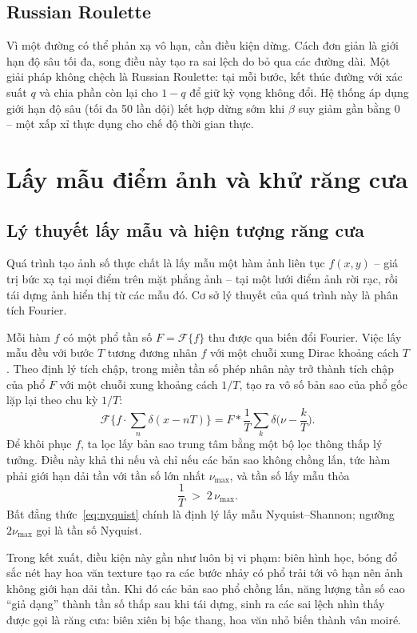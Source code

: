 \subsection{Russian Roulette}
Vì một đường có thể phản xạ vô hạn, cần điều kiện dừng. Cách đơn giản là giới hạn
độ sâu tối đa, song điều này tạo ra sai lệch do bỏ qua các đường dài. Một
giải pháp không chệch là Russian Roulette: tại mỗi
bước, kết thúc đường với xác suất $q$ và chia phần còn lại cho $1-q$ để giữ kỳ
vọng không đổi. Hệ thống áp dụng giới hạn độ sâu (tối đa 50 lần dội) kết hợp dừng
sớm khi $\beta$ suy giảm gần bằng 0 -- một xấp xỉ thực dụng cho chế độ thời gian
thực.

\section{Lấy mẫu điểm ảnh và khử răng cưa}

\subsection{Lý thuyết lấy mẫu và hiện tượng răng cưa}
Quá trình tạo ảnh số thực chất là lấy mẫu một hàm ảnh liên tục
$f(x,y)$ -- giá trị bức xạ tại mọi điểm trên mặt phẳng ảnh -- tại một lưới điểm
ảnh rời rạc, rồi tái dựng ảnh hiển thị từ các mẫu đó. Cơ
sở lý thuyết của quá trình này là phân tích Fourier.

Mỗi hàm $f$ có một phổ tần số $F = \mathcal{F}\{f\}$ thu được qua biến đổi
Fourier. Việc lấy mẫu đều với bước $T$ tương đương nhân $f$ với một chuỗi xung
Dirac khoảng cách $T$. Theo định lý tích chập, trong miền tần số
phép nhân này trở thành tích chập của phổ $F$ với một chuỗi xung khoảng cách
$1/T$, tạo ra vô số bản sao của phổ gốc lặp lại theo chu kỳ $1/T$:
\begin{equation}
\mathcal{F}\Big\{ f \cdot \textstyle\sum_n \delta(x - nT)\Big\}
   = F * \frac{1}{T}\sum_k \delta\!\Big(\nu - \frac{k}{T}\Big).
\end{equation}
Để khôi phục $f$, ta lọc lấy bản sao trung tâm bằng một bộ lọc thông thấp lý
tưởng. Điều này khả thi nếu và chỉ nếu các bản sao không chồng lấn, tức
hàm phải giới hạn dải tần với tần số lớn nhất $\nu_{\max}$,
và tần số lấy mẫu thỏa
\begin{equation}
\label{eq:nyquist}
\frac{1}{T} \;>\; 2\,\nu_{\max} .
\end{equation}
Bất đẳng thức~\eqref{eq:nyquist} chính là định lý lấy mẫu
Nyquist--Shannon; ngưỡng $2\nu_{\max}$ gọi là tần số Nyquist.

Trong kết xuất, điều kiện này gần như luôn bị vi phạm: biên hình học, bóng đổ
sắc nét hay hoa văn texture tạo ra các bước nhảy có phổ trải tới vô hạn
nên ảnh không giới hạn dải tần. Khi đó các bản sao phổ chồng lấn, năng
lượng tần số cao ``giả dạng'' thành tần số thấp sau khi tái dựng, sinh ra các
sai lệch nhìn thấy được gọi là răng cưa: biên xiên bị bậc
thang, hoa văn nhỏ biến thành vân moiré.

